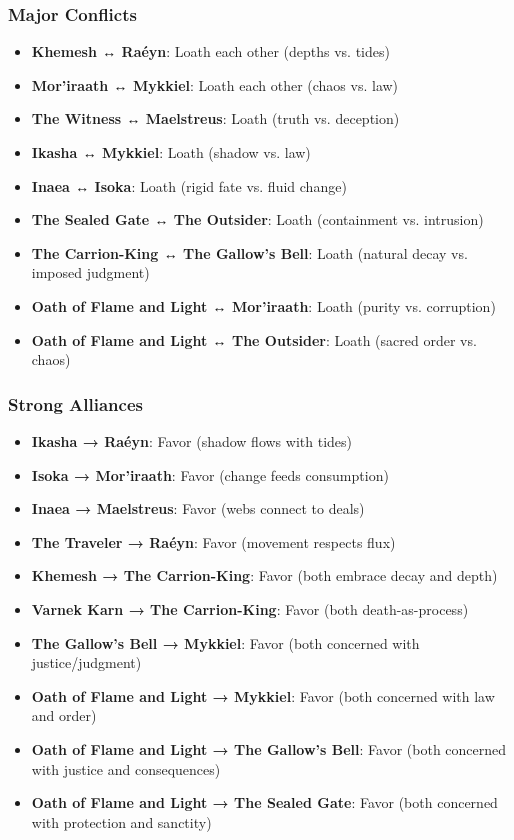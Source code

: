 \documentclass[12pt,twoside]{book}
\begin{document}
\subsubsection{Major Conflicts}
\begin{itemize}
\item \textbf{Khemesh ↔ Raéyn}: Loath each other (depths vs. tides)
\item \textbf{Mor'iraath ↔ Mykkiel}: Loath each other (chaos vs. law)
\item \textbf{The Witness ↔ Maelstreus}: Loath (truth vs. deception)
\item \textbf{Ikasha ↔ Mykkiel}: Loath (shadow vs. law)
\item \textbf{Inaea ↔ Isoka}: Loath (rigid fate vs. fluid change)
\item \textbf{The Sealed Gate ↔ The Outsider}: Loath (containment vs. intrusion)
\item \textbf{The Carrion-King ↔ The Gallow's Bell}: Loath (natural decay vs. imposed judgment)
\item \textbf{Oath of Flame and Light ↔ Mor'iraath}: Loath (purity vs. corruption)
\item \textbf{Oath of Flame and Light ↔ The Outsider}: Loath (sacred order vs. chaos)
\end{itemize}

\subsubsection{Strong Alliances}
\begin{itemize}
\item \textbf{Ikasha → Raéyn}: Favor (shadow flows with tides)
\item \textbf{Isoka → Mor'iraath}: Favor (change feeds consumption)
\item \textbf{Inaea → Maelstreus}: Favor (webs connect to deals)
\item \textbf{The Traveler → Raéyn}: Favor (movement respects flux)
\item \textbf{Khemesh → The Carrion-King}: Favor (both embrace decay and depth)
\item \textbf{Varnek Karn → The Carrion-King}: Favor (both death-as-process)
\item \textbf{The Gallow's Bell → Mykkiel}: Favor (both concerned with justice/judgment)
\item \textbf{Oath of Flame and Light → Mykkiel}: Favor (both concerned with law and order)
\item \textbf{Oath of Flame and Light → The Gallow's Bell}: Favor (both concerned with justice and consequences)
\item \textbf{Oath of Flame and Light → The Sealed Gate}: Favor (both concerned with protection and sanctity)
\end{itemize}
\end{document}
